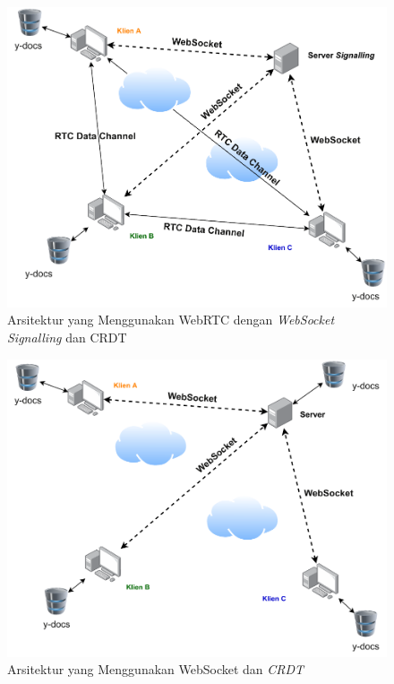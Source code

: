 \begin{figure}
    \centering
    \includegraphics[scale=0.65]{assets/skripsi/Arsitektur_WebRTC_CRDT}
    \caption{Arsitektur yang Menggunakan WebRTC dengan \textit{WebSocket Signalling} dan CRDT}
\end{figure}

\begin{figure}
    \centering
    \includegraphics[scale=0.65]{assets/skripsi/Arsitektur_WebSocket_CRDT}
    \caption{Arsitektur yang Menggunakan WebSocket dan \textit{CRDT}}
\end{figure}

